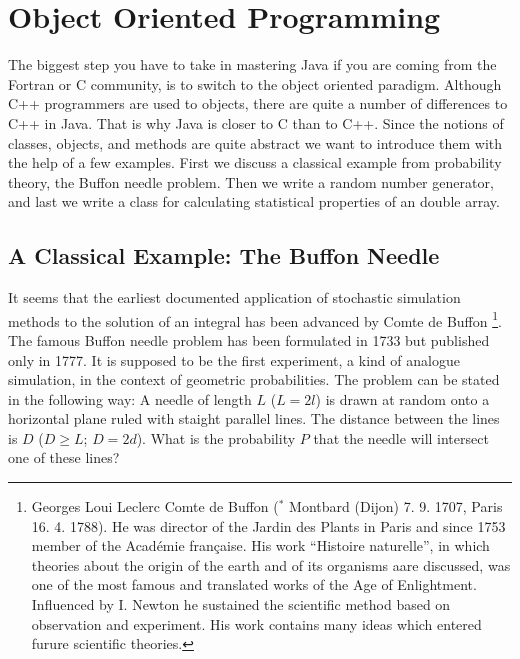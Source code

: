 \section{Object Oriented Programming}
\label{sec:objectoriented}
The biggest step you have to take in mastering Java if you are
coming from the Fortran or C community, is to switch to the object
oriented paradigm. Although C++ programmers are used to objects, there
are quite a number of differences to C++ in Java. That is why Java
is closer to C than to C++. Since the notions of classes, objects, and
methods are quite abstract we want to introduce them with the help of
a few examples. First we discuss a classical example from probability theory,
the Buffon needle problem. Then we write a random number 
generator, and last we write a class for calculating 
statistical properties of an double array.  


\subsection{A Classical Example: The Buffon Needle}

It seems that the earliest documented application of stochastic simulation
methods to the solution of an integral has been advanced by Comte de
Buffon \footnote{Georges Loui Leclerc Comte de Buffon ($^*$ Montbard
  (Dijon) 7. 9. 1707, \dag Paris 16. 4. 1788). He was director of the
  Jardin des Plants in Paris and since 1753 member of the Acad\'emie 
fran\c{c}aise. His  work ``Histoire naturelle'', in which theories
about the origin of the earth and of  its organisms aare discussed,
was one of the most famous and translated works of the Age of
Enlightment. Influenced by I. Newton he sustained the scientific
method based on observation and experiment. His work contains many
ideas which entered furure scientific theories.}. The famous Buffon
needle problem has been formulated in 1733 but published only in 1777. It is
supposed
to be the first experiment, a kind of analogue simulation, in the
context of geometric probabilities. The problem can be stated in the
following way: A needle of length $L$ ($L=2l$) is drawn at random onto a
horizontal plane ruled with staight parallel lines. The distance
between the lines is $D$ ($D \ge L$; $D=2d$). 
What is the probability $P$ that the
needle will intersect one of these lines?


